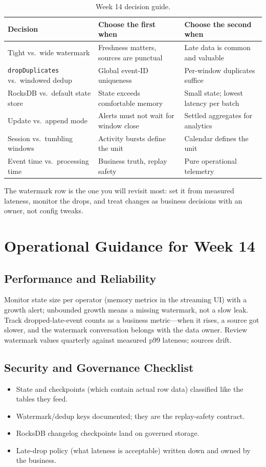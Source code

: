 \begin{table}[H]
\centering
\small
\begin{tabular}{@{}p{3.4cm}p{4.4cm}p{4.6cm}@{}}
\toprule
\textbf{Decision} & \textbf{Choose the first when} & \textbf{Choose the second when} \\
\midrule
Tight vs.\ wide watermark & Freshness matters, sources are punctual & Late data is common and valuable \\
\texttt{dropDuplicates} vs.\ windowed dedup & Global event-ID uniqueness & Per-window duplicates suffice \\
RocksDB vs.\ default state store & State exceeds comfortable memory & Small state; lowest latency per batch \\
Update vs.\ append mode & Alerts must not wait for window close & Settled aggregates for analytics \\
Session vs.\ tumbling windows & Activity bursts define the unit & Calendar defines the unit \\
Event time vs.\ processing time & Business truth, replay safety & Pure operational telemetry \\
\bottomrule
\end{tabular}
\caption{Week 14 decision guide.}
\label{tab:ch14-decisions}
\end{table}

The watermark row is the one you will revisit most: set it from measured lateness, monitor the drops, and treat changes as business decisions with an owner, not config tweaks.

\section{Operational Guidance for Week 14}
%
\subsection{Performance and Reliability}
Monitor state size per operator (memory metrics in the streaming UI) with a growth alert; unbounded growth means a missing watermark, not a slow leak. Track dropped-late-event counts as a business metric---when it rises, a source got slower, and the watermark conversation belongs with the data owner. Review watermark values quarterly against measured p99 lateness; sources drift.

\subsection{Security and Governance Checklist}
\begin{itemize}
    \item State and checkpoints (which contain actual row data) classified like the tables they feed.
    \item Watermark/dedup keys documented; they are the replay-safety contract.
    \item RocksDB changelog checkpoints land on governed storage.
    \item Late-drop policy (what lateness is acceptable) written down and owned by the business.
\end{itemize}

